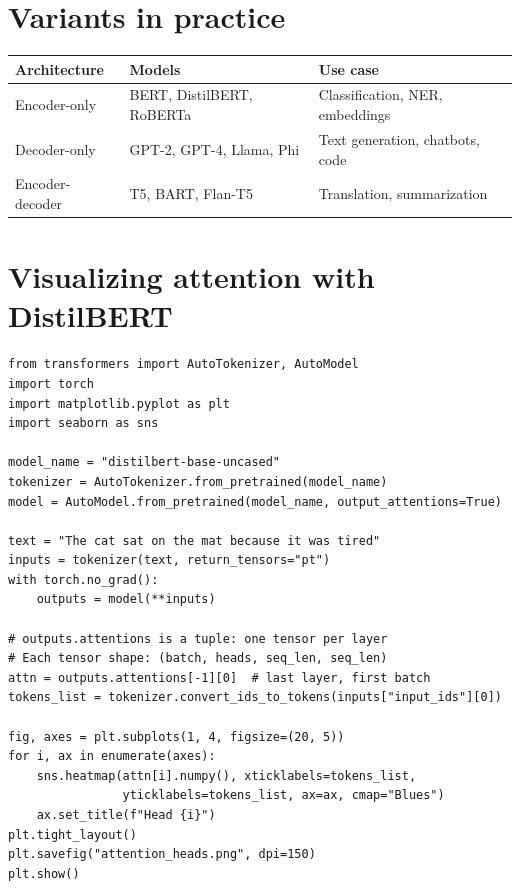 \section{Variants in practice}

\begin{longtable}{p{3.5cm}p{3.5cm}p{5cm}}
\toprule
\textbf{Architecture} & \textbf{Models} & \textbf{Use case} \\
\midrule
Encoder-only & BERT, DistilBERT, RoBERTa & Classification, NER, embeddings \\
Decoder-only & GPT-2, GPT-4, Llama, Phi & Text generation, chatbots, code \\
Encoder-decoder & T5, BART, Flan-T5 & Translation, summarization \\
\bottomrule
\end{longtable}

\section{Visualizing attention with DistilBERT}

\begin{verbatim}
from transformers import AutoTokenizer, AutoModel
import torch
import matplotlib.pyplot as plt
import seaborn as sns

model_name = "distilbert-base-uncased"
tokenizer = AutoTokenizer.from_pretrained(model_name)
model = AutoModel.from_pretrained(model_name, output_attentions=True)

text = "The cat sat on the mat because it was tired"
inputs = tokenizer(text, return_tensors="pt")
with torch.no_grad():
    outputs = model(**inputs)

# outputs.attentions is a tuple: one tensor per layer
# Each tensor shape: (batch, heads, seq_len, seq_len)
attn = outputs.attentions[-1][0]  # last layer, first batch
tokens_list = tokenizer.convert_ids_to_tokens(inputs["input_ids"][0])

fig, axes = plt.subplots(1, 4, figsize=(20, 5))
for i, ax in enumerate(axes):
    sns.heatmap(attn[i].numpy(), xticklabels=tokens_list,
                yticklabels=tokens_list, ax=ax, cmap="Blues")
    ax.set_title(f"Head {i}")
plt.tight_layout()
plt.savefig("attention_heads.png", dpi=150)
plt.show()
\end{verbatim}

